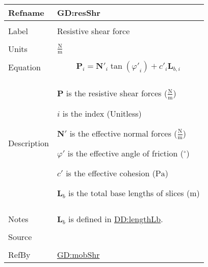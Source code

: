 \documentclass[12pt]{article}
\begin{document}
\vspace{\baselineskip}
\noindent
\begin{minipage}{\textwidth}
\begin{tabular}{>{\raggedright}p{}>{\raggedright\arraybackslash}p{}}
\toprule \textbf{Refname} & \textbf{GD:resShr}
\label{GD:resShr}
\\ \midrule \\
Label & Resistive shear force
        
\\ \midrule \\
Units & $\frac{\text{N}}{\text{m}}$
        
\\ \midrule \\
Equation & \begin{displaymath}
           {\symbf{P}}_{i}={\symbf{N'}}_{i} \tan\left({φ'}_{i}\right)+{c'}_{i} {\symbf{L}_{b,i}}
           \end{displaymath}
\\ \midrule \\
Description & \begin{symbDescription}
              \item{$\symbf{P}$ is the resistive shear forces ($\frac{\text{N}}{\text{m}}$)}
              \item{$i$ is the index (Unitless)}
              \item{$\symbf{N'}$ is the effective normal forces ($\frac{\text{N}}{\text{m}}$)}
              \item{$φ'$ is the effective angle of friction (${{}^{\circ}}$)}
              \item{$c'$ is the effective cohesion (${\text{Pa}}$)}
              \item{${\symbf{L}_{b}}$ is the total base lengths of slices (${\text{m}}$)}
              \end{symbDescription}
\\ \midrule \\
Notes & ${\symbf{L}_{b}}$ is defined in \hyperref[DD:lengthLb]{DD:lengthLb}.
        
\\ \midrule \\
Source & \cite{chen2005}
         
\\ \midrule \\
RefBy & \hyperref[GD:mobShr]{GD:mobShr}
        
\\ \bottomrule
\end{tabular}
\end{minipage}
\end{document}
